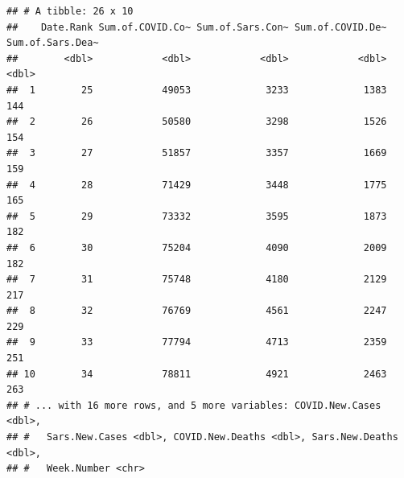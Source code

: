 \documentclass[
]{article}
\newenvironment{Shaded}{\begin{snugshade}}{\end{snugshade}}
\newcommand{\DecValTok}[1]{\textcolor[rgb]{0.00,0.00,0.81}{#1}}
\newcommand{\KeywordTok}[1]{\textcolor[rgb]{0.13,0.29,0.53}{\textbf{#1}}}
\newcommand{\NormalTok}[1]{#1}
\newcommand{\OperatorTok}[1]{\textcolor[rgb]{0.81,0.36,0.00}{\textbf{#1}}}
\newcommand{\StringTok}[1]{\textcolor[rgb]{0.31,0.60,0.02}{#1}}
\begin{document}
\begin{Shaded}
\end{Shaded}

\begin{verbatim}
## # A tibble: 26 x 10
##    Date.Rank Sum.of.COVID.Co~ Sum.of.Sars.Con~ Sum.of.COVID.De~ Sum.of.Sars.Dea~
##        <dbl>            <dbl>            <dbl>            <dbl>            <dbl>
##  1        25            49053             3233             1383              144
##  2        26            50580             3298             1526              154
##  3        27            51857             3357             1669              159
##  4        28            71429             3448             1775              165
##  5        29            73332             3595             1873              182
##  6        30            75204             4090             2009              182
##  7        31            75748             4180             2129              217
##  8        32            76769             4561             2247              229
##  9        33            77794             4713             2359              251
## 10        34            78811             4921             2463              263
## # ... with 16 more rows, and 5 more variables: COVID.New.Cases <dbl>,
## #   Sars.New.Cases <dbl>, COVID.New.Deaths <dbl>, Sars.New.Deaths <dbl>,
## #   Week.Number <chr>
\end{verbatim}

\begin{Shaded}
\end{Shaded}
\end{document}
